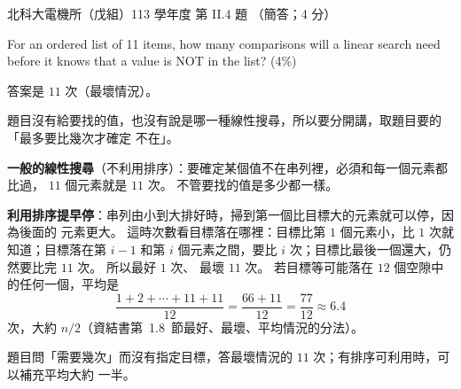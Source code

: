 \begin{pastexam}[label={px:ntut-113-ee-ds-08}]{北科大電機所（戊組）113 學年度 第 II.4 題}
（簡答；4 分）

For an ordered list of 11 items, how many comparisons will a linear search need before it knows
that a value is NOT in the list? (4\%)
\end{pastexam}

\begin{pastsoln}
答案是 $11$ 次（最壞情況）。

題目沒有給要找的值，也沒有說是哪一種線性搜尋，所以要分開講，取題目要的「最多要比幾次才確定
不在」。

\textbf{一般的線性搜尋}（不利用排序）：要確定某個值不在串列裡，必須和每一個元素都比過，
$11$ 個元素就是 $11$ 次。 不管要找的值是多少都一樣。

\textbf{利用排序提早停}：串列由小到大排好時，掃到第一個比目標大的元素就可以停，因為後面的
元素更大。 這時次數看目標落在哪裡：目標比第 $1$ 個元素小，比 $1$ 次就知道；目標落在第 $i - 1$
和第 $i$ 個元素之間，要比 $i$ 次；目標比最後一個還大，仍然要比完 $11$ 次。 所以最好 $1$ 次、
最壞 $11$ 次。 若目標等可能落在 $12$ 個空隙中的任何一個，平均是
\[
\frac{1 + 2 + \cdots + 11 + 11}{12} = \frac{66 + 11}{12} = \frac{77}{12} \approx 6.4
\]
次，大約 $n/2$（資結書第~1.8~節最好、最壞、平均情況的分法）。

題目問「需要幾次」而沒有指定目標，答最壞情況的 $11$ 次；有排序可利用時，可以補充平均大約
一半。
\end{pastsoln}
